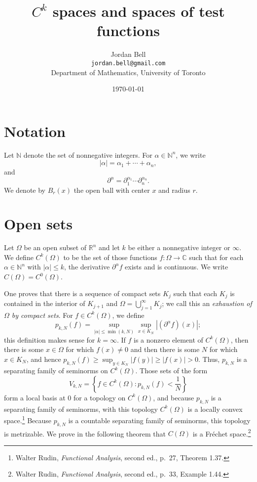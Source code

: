 \documentclass{article}
\begin{document}
\title{$C^k$ spaces and spaces of test functions}
\author{Jordan Bell\\ \texttt{jordan.bell@gmail.com}\\Department of Mathematics, University of Toronto}
\date{\today}

\maketitle

\section{Notation}
Let $\mathbb{N}$ denote the set of nonnegative integers. For $\alpha \in \mathbb{N}^n$, we write
\[
|\alpha| = \alpha_1+\cdots+\alpha_n,
\]
and
\[
\partial^\alpha=\partial_1^{\alpha_1} \cdots \partial_n^{\alpha_n}.
\]
We denote by $B_r(x)$ the open ball with center $x$ and radius $r$.

\section{Open sets}
Let $\Omega$ be an open subset of $\mathbb{R}^n$ and let $k$ be either a nonnegative integer or $\infty$.
We define $C^k(\Omega)$ to be the set of those functions $f:\Omega \to \mathbb{C}$ such that for each $\alpha \in \mathbb{N}^n$ with $|\alpha| \leq k$, the derivative $\partial^\alpha f$ exists and is continuous. We write $C(\Omega)=C^0(\Omega)$.

One proves that there is a sequence of compact sets $K_j$
such that each $K_j$ is contained in the interior of $K_{j+1}$ and $\Omega=\bigcup_{j=1}^\infty K_j$;
 we call this an {\em exhaustion of $\Omega$ by compact sets}.
For $f \in C^k(\Omega)$, we define
\[
p_{k,N}(f)= \sup_{|\alpha| \leq \min(k,N)} \sup_{x \in K_N} |(\partial^\alpha f)(x)|;
\]
this definition makes sense for $k=\infty$.
 If $f$ is a nonzero element of $C^k(\Omega)$, then there is some $x \in \Omega$ for which $f(x) \neq 0$ and then
  there is some $N$ for which $x \in K_N$, and hence 
$p_{k,N}(f) \geq \sup_{y \in K_N} |f(y)| \geq |f(x)| > 0$.
Thus, $p_{k,N}$ is a separating family of seminorms on $C^k(\Omega)$.
Those sets of the form
\[
V_{k,N} = \left\{ f \in C^k(\Omega): p_{k,N}(f)<\frac{1}{N} \right\}
\]
form a local basis at $0$ for a topology on $C^k(\Omega)$, and because $p_{k,N}$ is a separating family of seminorms, with
this topology $C^k(\Omega)$ is a locally convex space.\footnote{Walter
Rudin, {\em Functional Analysis}, second ed., p.~27, Theorem 1.37.} Because $p_{k,N}$ is a countable separating family of
seminorms, this topology is metrizable.
We prove in the following theorem that 
$C(\Omega)$ is a Fr\'echet space.\footnote{Walter Rudin, {\em Functional Analysis}, second ed.,
p.~33, Example 1.44.} 
\end{document}
